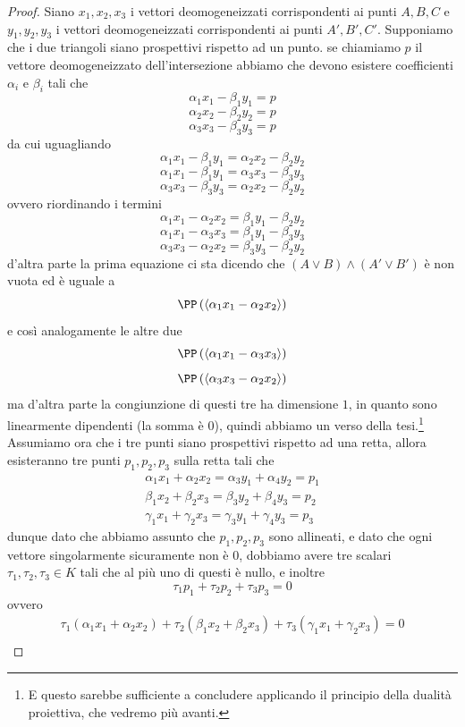 \documentclass[11pt]{scrartcl}
\begin{document}
   	 \begin{proof}
   	 	Siano $x_1,x_2,x_3$ i vettori deomogeneizzati corrispondenti ai punti $A,B,C$ e $y_1,y_2,y_3$ i vettori deomogeneizzati corrispondenti ai punti $A',B',C'$. Supponiamo che i due triangoli siano prospettivi rispetto ad un punto. se chiamiamo $p$ il vettore deomogeneizzato dell'intersezione abbiamo che devono esistere coefficienti $\alpha_i$ e $\beta_i$ tali che
   	 	$$\alpha_1x_1-\beta_1y_1=p$$
   	 	$$\alpha_2x_2-\beta_2y_2=p$$
   	 	$$\alpha_3x_3-\beta_3y_3=p$$
   	 	da cui uguagliando
   	 	$$\alpha_1x_1-\beta_1y_1=\alpha_2x_2-\beta_2y_2$$
   	 	$$\alpha_1x_1-\beta_1y_1=\alpha_3x_3-\beta_3y_3$$
   	 	$$\alpha_3x_3-\beta_3y_3=\alpha_2x_2-\beta_2y_2$$
   	 	ovvero riordinando i termini
   	 	$$\alpha_1x_1-\alpha_2x_2=\beta_1y_1-\beta_2y_2$$
   	 	$$\alpha_1x_1-\alpha_3x_3=\beta_1y_1-\beta_3y_3$$
   	 	$$\alpha_3x_3-\alpha_2x_2=\beta_3y_3-\beta_2y_2$$
   	 	d'altra parte la prima equazione ci sta dicendo che $(A\lor B)\land(A'\lor B')$ è non vuota ed è uguale a
   	 	$$\PP\left(\langle \alpha_1x_1-\alpha_2x_2 \rangle\right)$$
   	 	e così analogamente le altre due
   	 	$$\PP\left(\langle \alpha_1x_1-\alpha_3x_3 \rangle\right)$$
   	 	$$\PP\left(\langle \alpha_3x_3-\alpha_2x_2 \rangle\right)$$
   	 	ma d'altra parte la congiunzione di questi tre ha dimensione $1$, in quanto sono linearmente dipendenti (la somma è $0$), quindi abbiamo un verso della tesi.\footnote{E questo sarebbe sufficiente a concludere applicando il principio della dualità proiettiva, che vedremo più avanti.} \\
   	 	Assumiamo ora che i tre punti siano prospettivi rispetto ad una retta, allora esisteranno tre punti $p_1,p_2,p_3$ sulla retta tali che
   	 	\begin{gather*}
   	 		\alpha_1x_1+\alpha_2x_2=\alpha_3y_1+\alpha_4y_2=p_1 \\
   	 		\beta_1x_2+\beta_2x_3=\beta_3y_2+\beta_4y_3=p_2 \\
   	 		\gamma_1x_1+\gamma_2x_3=\gamma_3y_1+\gamma_4y_3=p_3
   	 	\end{gather*}
   	 	dunque dato che abbiamo assunto che $p_1,p_2,p_3$ sono allineati, e dato che ogni vettore singolarmente sicuramente non è $0$, dobbiamo avere tre scalari $\tau_1,\tau_2,\tau_3\in K$ tali che al più uno di questi è nullo, e inoltre
   	 	$$\tau_1p_1+\tau_2p_2+\tau_3p_3=0$$
   	 	ovvero
   	 	\begin{gather*}
   	 		\tau_1\left(\alpha_1x_1+\alpha_2x_2\right)+\tau_2\left(\beta_1x_2+\beta_2x_3\right)+\tau_3\left(\gamma_1x_1+\gamma_2x_3\right)=0 \\

\end{gather*}
\end{proof}
\end{document}
